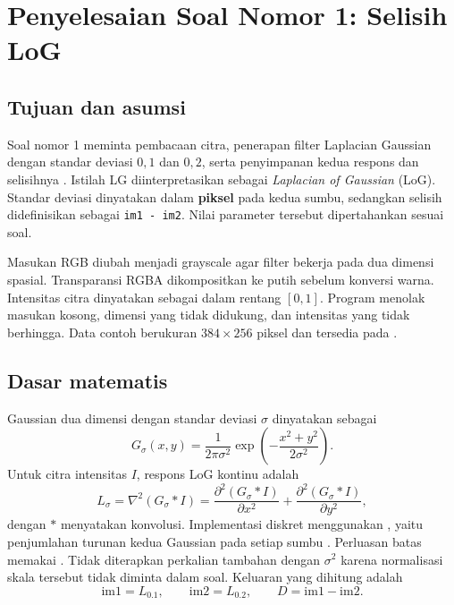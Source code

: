 \section{Penyelesaian Soal Nomor 1: Selisih LoG}
\label{sec:soal1}

\subsection{Tujuan dan asumsi}

Soal nomor 1 meminta pembacaan citra, penerapan filter Laplacian Gaussian
dengan standar deviasi $0{,}1$ dan $0{,}2$, serta penyimpanan kedua respons
dan selisihnya \cite{soal-uts}. Istilah LG diinterpretasikan sebagai
\textit{Laplacian of Gaussian} (LoG). Standar deviasi dinyatakan dalam
\textbf{piksel} pada kedua sumbu, sedangkan selisih didefinisikan sebagai
\texttt{im1 - im2}. Nilai parameter tersebut dipertahankan sesuai soal.

Masukan RGB diubah menjadi grayscale agar filter bekerja pada dua dimensi
spasial. Transparansi RGBA dikompositkan ke putih sebelum konversi warna.
Intensitas citra dinyatakan sebagai  dalam rentang $[0,1]$.
Program menolak masukan kosong, dimensi yang tidak didukung, dan intensitas
yang tidak berhingga. Data contoh berukuran $384 \times 256$ piksel dan
tersedia pada .

\subsection{Dasar matematis}

Gaussian dua dimensi dengan standar deviasi $\sigma$ dinyatakan sebagai
\begin{equation}
G_\sigma(x,y)=\frac{1}{2\pi\sigma^2}
\exp\!\left(-\frac{x^2+y^2}{2\sigma^2}\right).
\end{equation}
Untuk citra intensitas $I$, respons LoG kontinu adalah
\begin{equation}
L_\sigma=\nabla^2(G_\sigma * I)
=\frac{\partial^2(G_\sigma * I)}{\partial x^2}
+\frac{\partial^2(G_\sigma * I)}{\partial y^2},
\end{equation}
dengan $*$ menyatakan konvolusi. Implementasi diskret menggunakan
, yaitu penjumlahan turunan kedua
Gaussian pada setiap sumbu \cite{scipy-log}. Perluasan batas memakai
. Tidak diterapkan perkalian tambahan dengan $\sigma^2$
karena normalisasi skala tersebut tidak diminta dalam soal. Keluaran
yang dihitung adalah
\begin{equation}
\mathrm{im1}=L_{0.1},\qquad
\mathrm{im2}=L_{0.2},\qquad
D=\mathrm{im1}-\mathrm{im2}.
\end{equation}

